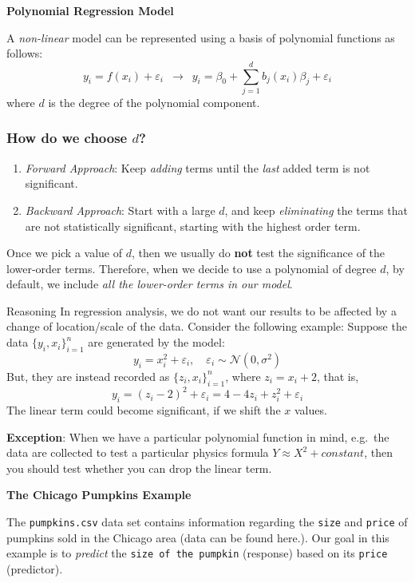 \documentclass[
]{book}
\begin{document}
\textbf{Polynomial Regression Model}

A \emph{non-linear} model can be represented using a basis of polynomial functions as follows:
\[y_i = f(x_i) + \varepsilon_i \,\,\, \longrightarrow \,\,\, y_i =\beta_0 + \sum_{j=1}^{d} b_j(x_i) \beta_j + \varepsilon_i\]
where \(d\) is the degree of the polynomial component.

\subsubsection*{\texorpdfstring{How do we choose \(d\)? }{How do we choose d? }}\label{how-do-we-choose-d}

\begin{enumerate}
\def\labelenumi{\arabic{enumi}.}
\item
  \emph{Forward Approach}: Keep \emph{adding} terms until the \emph{last} added term is not significant.
\item
  \emph{Backward Approach}: Start with a large \(d\), and keep \emph{eliminating} the terms that are not statistically significant, starting with the highest order term.
\end{enumerate}

Once we pick a value of \(d\), then we usually do \textbf{not} test the significance of the lower-order terms. Therefore, when we decide to use a polynomial of degree \(d\), by default, we include \emph{all the lower-order terms in our model}.

Reasoning
In regression analysis, we do not want our results to be affected by a change of location/scale of the data. Consider the following example:
Suppose the data \(\{y_i,x_i\}_{i=1}^n\) are generated by the model:
\[y_i=x_i^2 + \varepsilon_i,\quad \varepsilon_i \sim \mathcal{N}(0,\sigma^2)\]
But, they are instead recorded as \(\{z_i,x_i\}_{i=1}^n\), where \(z_i=x_i+2\), that is,
\[y_i=(z_i-2)^2 + \varepsilon_i=4 -4z_i +z_i^2+\varepsilon_i\]
The linear term could become significant, if we shift the \(x\) values.

\textbf{Exception}: When we have a particular polynomial function in mind, e.g.~the data are collected to test a particular physics formula \(Y\approx X^2 + constant\), then you should test whether you can drop the linear term.

\textbf{The Chicago Pumpkins Example}

The \texttt{pumpkins.csv} data set contains information regarding the \texttt{size} and \texttt{price} of pumpkins sold in the Chicago area (data can be found here.). Our goal in this example is to \emph{predict} the \texttt{size\ of\ the\ pumpkin} (response) based on its \texttt{price} (predictor).
\end{document}
